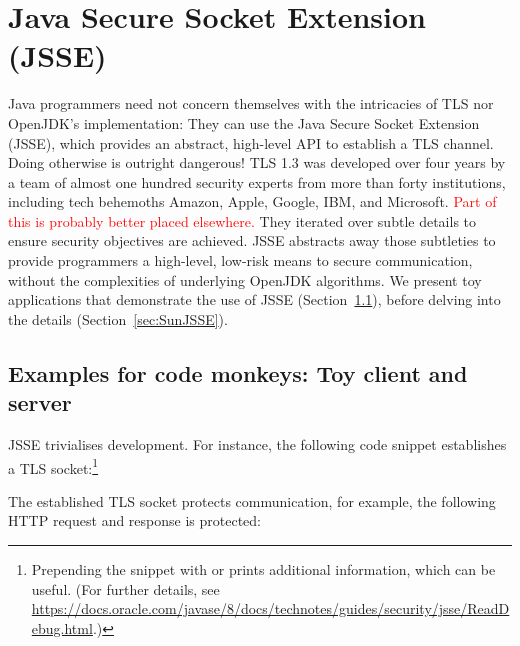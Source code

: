 \section{Java Secure Socket Extension (JSSE)}\label{sec:JSSE}

Java programmers need not concern themselves with the intricacies of TLS 
nor OpenJDK's implementation: They can 
use the Java Secure Socket Extension (JSSE), which provides an abstract, high-level
API to establish a TLS channel. Doing otherwise is outright dangerous! TLS 1.3 
was developed over four years by a team of almost one hundred security experts 
from more than forty institutions, including tech behemoths Amazon, Apple, Google, 
IBM, and Microsoft. \ifPresentationNotes \textcolor{red}{Part of this is probably 
better placed elsewhere.} \fi
They iterated over subtle details to ensure security objectives are achieved.
JSSE abstracts away those subtleties to provide programmers a high-level, 
low-risk means to secure communication, without the complexities of underlying 
OpenJDK algorithms.
We present toy applications that demonstrate the use of JSSE (Section~\ref{sec:monkeys}), 
before delving into the details (Section~\ref{sec:SunJSSE}).


\subsection{Examples for code monkeys: Toy client and server}\label{sec:monkeys}

\ifPresentationNotes
{}
\fi

JSSE trivialises development. For instance, the following code 
snippet establishes a TLS socket:\footnote{%
  Prepending the snippet with 
  or 
  prints additional information, which can be useful. 
  (For further details, see \url{https://docs.oracle.com/javase/8/docs/technotes/guides/security/jsse/ReadDebug.html}.)
}



\noindent 
The established TLS socket protects communication, for example, the following HTTP
request and response is protected:

